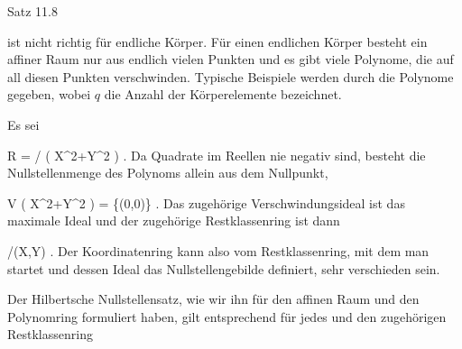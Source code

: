 {





Satz 11.8

ist nicht richtig für endliche Körper. Für einen endlichen Körper besteht ein affiner Raum nur aus endlich vielen Punkten und es gibt viele Polynome, die auf all diesen Punkten verschwinden. Typische Beispiele werden durch die Polynome
 gegeben, wobei $q$ die Anzahl der Körperelemente bezeichnet.





}

{





Es sei

\mavergleichskette
{\vergleichskette
{ R
}
{ = }{ \R[X,Y]/ \left(  X^2+Y^2  \right)
}
{  }{
}
{    }{
}
{   }{
}
}
{}{}{.}
Da Quadrate im Reellen nie negativ sind, besteht die Nullstellenmenge des Polynoms
 allein aus dem Nullpunkt,

\mavergleichskette
{\vergleichskette
{ V \left(  X^2+Y^2  \right)
}
{ = }{ \{(0,0)\}
}
{  }{
}
{    }{
}
{   }{
}
}
{}{}{.}
Das zugehörige Verschwindungsideal ist das maximale Ideal
 und der zugehörige Restklassenring
 {} {}
ist dann

\mavergleichskette
{\vergleichskette
{ \R[X,Y]/(X,Y)
}
{ \cong }{ \R
}
{  }{
}
{    }{
}
{   }{
}
}
{}{}{.}
Der Koordinatenring kann also vom Restklassenring, mit dem man startet und dessen Ideal das Nullstellengebilde definiert, sehr verschieden sein.





}






Der Hilbertsche Nullstellensatz, wie wir ihn für den affinen Raum und den Polynomring formuliert haben, gilt entsprechend für jedes
 und den zugehörigen Restklassenring





